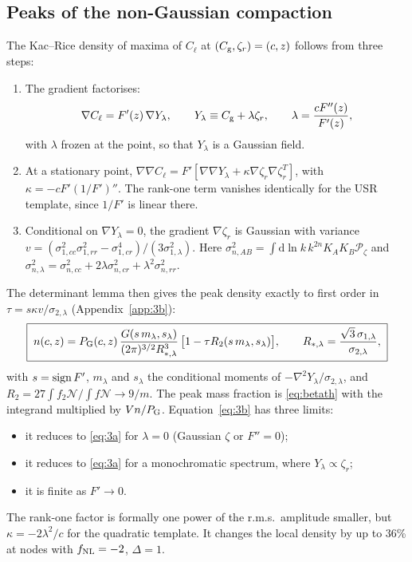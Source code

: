 \documentclass[11pt,a4paper]{article}
\newcommand{\Cg}{C_{\rm g}}
\newcommand{\Cl}{C_{\ell}}
\newcommand{\zr}{\zeta_r}
\newcommand{\dd}{\mathrm{d}}
\newcommand{\fnl}{f_{\rm NL}}
\newcommand{\Pz}{\mathcal{P}_\zeta}
\begin{document}
\subsection{Peaks of the non-Gaussian compaction}

The Kac--Rice density of maxima of $\Cl$ at $(\Cg,\zr)=(c,z)$ follows from three steps:
\begin{enumerate}
\item The gradient factorises:
\begin{equation}
\nabla\Cl=F'(z)\,\nabla Y_\lambda,\qquad Y_\lambda\equiv\Cg+\lambda\zr,\qquad \lambda=\frac{cF''(z)}{F'(z)},
\end{equation}
with $\lambda$ frozen at the point, so that $Y_\lambda$ is a Gaussian field.
\item At a stationary point, $\nabla\nabla\Cl=F'[\nabla\nabla Y_\lambda+\kappa\nabla\zr\nabla\zr^T]$,
with $\kappa=-cF'(1/F')''$. The rank-one term vanishes identically for the USR template, since
$1/F'$ is linear there.
\item Conditional on $\nabla Y_\lambda=0$, the gradient $\nabla\zr$ is Gaussian with variance
$v=(\sigma^2_{1,cc}\sigma^2_{1,rr}-\sigma^4_{1,cr})/(3\sigma^2_{1,\lambda})$. Here
$\sigma^2_{n,AB}=\int\dd\ln k\,k^{2n}K_AK_B\Pz$ and
$\sigma^2_{n,\lambda}=\sigma^2_{n,cc}+2\lambda\sigma^2_{n,cr}+\lambda^2\sigma^2_{n,rr}$.
\end{enumerate}
The determinant lemma then gives the peak density exactly to first order in $\tau=s\kappa
v/\sigma_{2,\lambda}$ (Appendix~\ref{app:3b}):
\begin{equation}
\boxed{\;n(c,z)=P_{\rm G}(c,z)\,\frac{G(s\,m_\lambda,s_\lambda)}{(2\pi)^{3/2}R_{*,\lambda}^3}\,
\big[1-\tau R_2(s\,m_\lambda,s_\lambda)\big],\qquad R_{*,\lambda}=\frac{\sqrt3\,\sigma_{1,\lambda}}{\sigma_{2,\lambda}},\;}
\label{eq:3b}
\end{equation}
with $s={\rm sign}\,F'$, $m_\lambda$ and $s_\lambda$ the conditional moments of
$-\nabla^2Y_\lambda/\sigma_{2,\lambda}$, and $R_2=27\int f_2\mathcal N/\int f\mathcal N\to9/m$. The peak
mass fraction is \eqref{eq:betath} with the integrand multiplied by $V n/P_{\rm G}$.
Equation~\eqref{eq:3b} has three limits:
\begin{itemize}
\item it reduces to \eqref{eq:3a} for $\lambda=0$ (Gaussian $\zeta$ or $F''=0$);
\item it reduces to \eqref{eq:3a} for a monochromatic spectrum, where $Y_\lambda\propto\zr$;
\item it is finite as $F'\to0$.
\end{itemize}
The rank-one factor is formally one power of the r.m.s.\ amplitude smaller, but
$\kappa=-2\lambda^2/c$ for the quadratic template. It changes the local density by up to 36\% at
nodes with $\fnl=-2$, $\Delta=1$.
\end{document}
